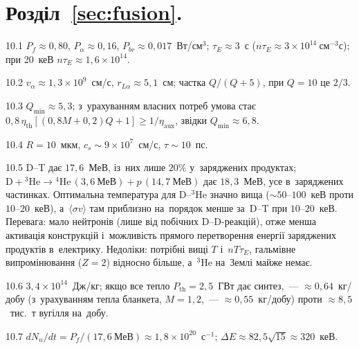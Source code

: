 \protect \section *{Розділ~\ref *{sec:fusion}. }
\begin{Solution}{10.{1}}
		$P_f\approx0{,}80$, $P_\alpha\approx0{,}16$, $P_{br}\approx0{,}017$~Вт/см$^3$; $\tau_E\approx3$~с ($n\tau_E\approx3\times10^{14}~\mathrm{см}^{-3}\mathrm{с}$); при 20~кеВ $n\tau_E\approx1{,}6\times10^{14}$.
	
\end{Solution}
\begin{Solution}{10.{2}}
		$v_\alpha\approx1{,}3\times10^{9}$~см/с, $r_{L\alpha}\approx5{,}1$~см; частка $Q/(Q+5)$, при $Q=10$ це $2/3$.
	
\end{Solution}
\begin{Solution}{10.{3}}
		$Q_{\min}\approx5{,}3$; з~урахуванням власних потреб умова стає
	$0{,}8\,\eta_{\mathrm{th}}[(0{,}8M+0{,}2)Q+1]\geq1/\eta_{\mathrm{aux}}$, звідки $Q_{\min}\approx6{,}8$.
	
\end{Solution}
\begin{Solution}{10.{4}}
		$R=10$~мкм, $c_s\sim9\times10^{7}$~см/с, $\tau\sim10$~пс.
	
\end{Solution}
\begin{Solution}{10.{5}}
		D--T дає $17{,}6$~МеВ, із~них лише $20\%$ у~заряджених продуктах;
	$\mathrm D+{}^3\mathrm{He}\to{}^4\mathrm{He}\,(3{,}6~\text{МеВ})+p\,(14{,}7~\text{МеВ})$ дає $18{,}3$~МеВ,
	усе в~заряджених частинках. Оптимальна температура для D--$^3$He значно вища
	($\sim50$--$100$~кеВ проти $10$--$20$~кеВ), а~$\langle\sigma v\rangle$ там приблизно на~порядок менше
	за~D--T при $10$--$20$~кеВ. Перевага: мало нейтронів (лише від побічних D--D-реакцій), отже менша
	активація конструкцій і~можливість прямого перетворення енергії заряджених продуктів в~електрику.
	Недоліки: потрібні вищі $T$ і~$nT\tau_E$, гальмівне випромінювання ($Z=2$) відносно більше,
	а~$^3$He на~Землі майже немає.
	
\end{Solution}
\begin{Solution}{10.{6}}
		$3{,}4\times10^{14}$~Дж/кг; якщо все тепло $P_{\mathrm{th}}=2{,}5$~ГВт дає синтез,~---
	$\approx0{,}64$~кг/добу (з~урахуванням тепла бланкета, $M=1{,}2$,~--- $\approx0{,}55$~кг/добу) проти
	$\approx8{,}5$~тис.~т вугілля на~добу.
	
\end{Solution}
\begin{Solution}{10.{7}}
		$dN_n/dt=P_f/(17{,}6~\text{МеВ})\approx1{,}8\times10^{20}$~с$^{-1}$; $\Delta E\approx82{,}5\sqrt{15}\approx320$~кеВ.
	
\end{Solution}
